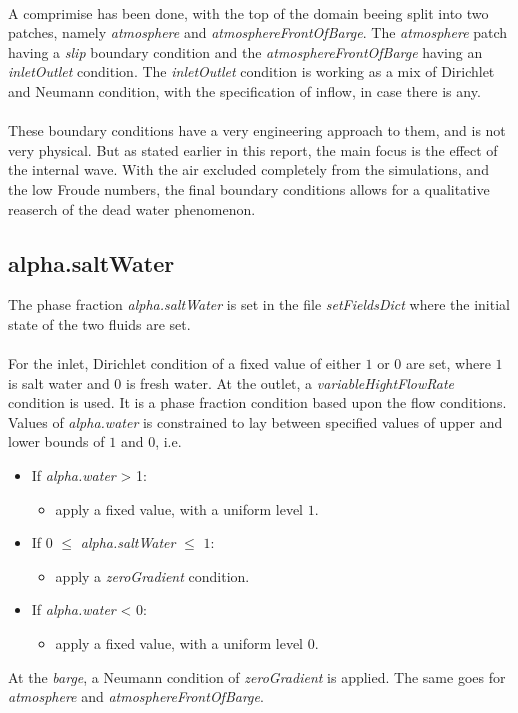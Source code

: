 \documentclass[a4paper, 12pt]{report}
\begin{document}
\\
A comprimise has been done, with the top of the domain beeing split into two patches, namely \textit{atmosphere} and \textit{atmosphereFrontOfBarge}. The \textit{atmosphere} patch having a \textit{slip} boundary condition and the \textit{atmosphereFrontOfBarge} having an \textit{inletOutlet} condition. The \textit{inletOutlet} condition is working as a mix of Dirichlet and Neumann condition, with the specification of inflow, in case there is any. \\
\\
These boundary conditions have a very engineering approach to them, and is not very physical. But as stated earlier in this report, the main focus is the effect of the internal wave. With the air excluded completely from the simulations, and the low Froude numbers, the final boundary conditions allows for a qualitative reaserch of the dead water phenomenon.
\subsection{alpha.saltWater}
The phase fraction \textit{alpha.saltWater} is set in the file \textit{setFieldsDict} where the initial state of the two fluids are set.\\
\\
For the inlet, Dirichlet condition of a fixed value of either $1$ or $0$ are set, where $1$ is salt water and $0$ is fresh water. At the outlet, a \textit{variableHightFlowRate} condition is used. It is a phase fraction condition based upon the flow conditions. Values of \textit{alpha.water} is constrained to lay between specified values of upper and lower bounds of $1$ and $0$, i.e.
\begin{itemize}
\item If \textit{alpha.water} > 1:
	\begin{itemize}
	\item apply a fixed value, with a uniform level $1$.
\end{itemize}
\item If $0$ $\leq$ \textit{alpha.saltWater} $\leq$ $1$:
	\begin{itemize}
	\item apply a \textit{zeroGradient} condition.
	\end{itemize}
\item If \textit{alpha.water} < 0:
	\begin{itemize}
	\item apply a fixed value, with a uniform level $0$.
\end{itemize}
\end{itemize}
At the \textit{barge}, a Neumann condition of \textit{zeroGradient} is applied. The same goes for \textit{atmosphere} and \textit{atmosphereFrontOfBarge}.
\end{document}
